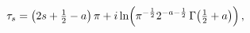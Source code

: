 \[\tau_{s}=\left(2s+\tfrac{1}{2}-a\right)\pi+i\mathop{\ln\/}\nolimits\!\left(\pi%
^{-\frac{1}{2}}2^{-a-\frac{1}{2}}\mathop{\Gamma\/}\nolimits\!\left(\tfrac{1}{2%
}+a\right)\right),\]